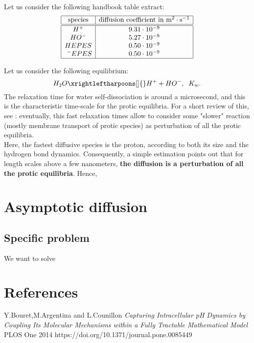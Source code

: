 \documentclass[aps,12pt]{revtex4}
\begin{document}
Let us consider the following handbook table extract:
\begin{equation}
\label{tab:diff}
\begin{array}{|c|c|}
\hline
\text{species} & \text{diffusion coefficient in } \text{m}^2\cdot\text{s}^{-1} \\
\hline
\hline
H^+     & 9.31 \cdot 10^{-9} \\
HO^-    & 5.27 \cdot 10^{-9} \\
 HEPES  &   0.50 \cdot 10^{-9}\\
~^-EPES &   0.50 \cdot 10^{-9}\\
\hline
\end{array}
\end{equation}

Let us consider the following equilibrium:
\begin{equation}
\label{eq:water}
H_2O \xrightleftharpoons[]{} H^+ + HO^-, \;\; K_w.
\end{equation}
The relaxation time for water self-dissociation is around a microsecond, and this is the characteristic time-scale
for the protic equilibria. For a short review of this, see \cite{PLOS}: eventually, this fast relaxation times allow to consider some "slower" reaction (mostly membrane transport of protic species) as perturbation of all the protic equilibria.\\
Here, the fastest diffusive species is the proton, according to both its size and the hydrogen bond dynamics.
Consequently, a simple estimation points out that for length scales above a few nanometers, \textbf{the diffusion is a perturbation of all the protic equilibria}.
Hence, 
\section{Asymptotic diffusion}

\subsection{Specific problem}
We want to solve


\section{References}
\begin{thebibliography}{1}

	Y.Bouret,M.Argentina and L.Counillon
	\textit{Capturing Intracellular pH Dynamics by Coupling Its Molecular Mechanisms within a Fully Tractable Mathematical Model}
	PLOS One 2014
	https://doi.org/10.1371/journal.pone.0085449

\end{thebibliography}
\end{document}
